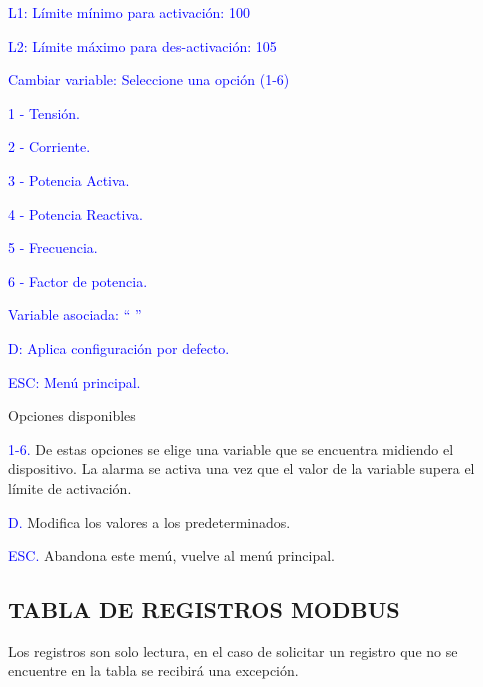 \textcolor{blue}{L1: Límite mínimo para activación: 100}

\textcolor{blue}{L2: Límite máximo para des-activación: 105}

\textcolor{blue}{Cambiar variable: Seleccione una opción (1-6)}

\textcolor{blue}{1 - Tensión.}

\textcolor{blue}{2 - Corriente.}

\textcolor{blue}{3 - Potencia Activa.}

\textcolor{blue}{4 - Potencia Reactiva.}

\textcolor{blue}{5 - Frecuencia.}

\textcolor{blue}{6 - Factor de potencia.}

\textcolor{blue}{Variable asociada: “ ”}

\textcolor{blue}{D: Aplica configuración por defecto.}

\textcolor{blue}{ESC: Menú principal.}

Opciones disponibles


\textcolor{blue}{1-6.}
De estas opciones se elige una variable que se encuentra midiendo el dispositivo. La alarma se activa una vez que el valor de la variable supera el límite de activación.

\textcolor{blue}{D.}
Modifica los valores a los predeterminados.

\textcolor{blue}{ESC.}
Abandona este menú, vuelve al menú principal.




\subsection{TABLA DE REGISTROS MODBUS}

Los registros son solo lectura, en el caso de solicitar un registro que no se encuentre en la tabla se recibirá una excepción.

